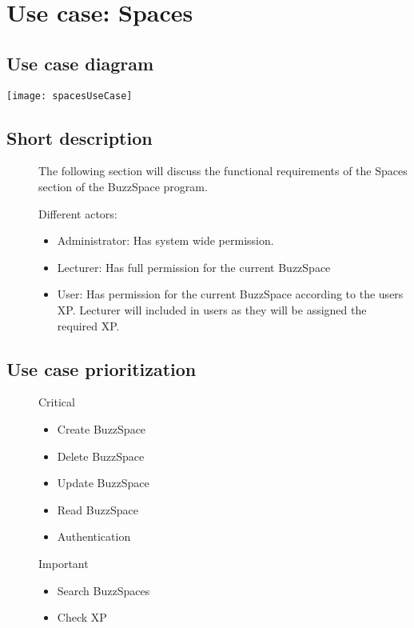 	\section{Use case: Spaces}
	\subsection{Use case diagram}
	\texttt{[image: spacesUseCase]}
	\subsection{Short description}
	\begin{description}
		
		\item[] 
			The following section will discuss the functional requirements of the Spaces section of the BuzzSpace program.
		
		\item[] Different actors:
		\begin{itemize}
			\item Administrator: Has system wide permission.
			\item Lecturer: Has full permission for the current BuzzSpace
			\item User: Has permission for the current BuzzSpace according to the users XP. Lecturer will included in users as they will be assigned the required XP.   
		\end{itemize}
		
	\end{description}
	
	\subsection{Use case prioritization}
	\begin{description}
		\item[] Critical
		\begin{itemize}
			\item Create BuzzSpace
			\item Delete BuzzSpace
			\item Update BuzzSpace
			\item Read BuzzSpace
			\item Authentication
		\end{itemize}
		
		\item[] Important
		\begin{itemize}
			\item Search BuzzSpaces
			\item Check XP
		\end{itemize}
	\end{description}
	

